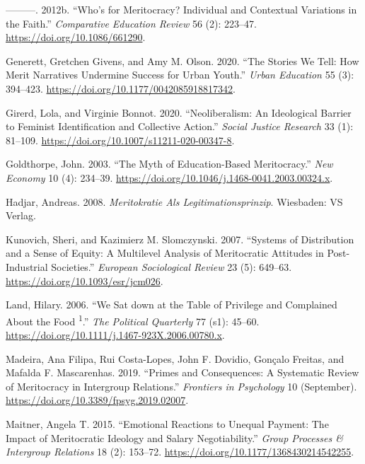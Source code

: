 \documentclass[
]{article}
\begin{document}
\leavevmode\hypertarget{ref-duru-bellat_whos_2012}{}%
---------. 2012b. ``Who's for Meritocracy? Individual and Contextual
Variations in the Faith.'' \emph{Comparative Education Review} 56 (2):
223--47. \url{https://doi.org/10.1086/661290}.

\leavevmode\hypertarget{ref-GenerettStoriesWeTell2020}{}%
Generett, Gretchen Givens, and Amy M. Olson. 2020. ``The Stories We
Tell: How Merit Narratives Undermine Success for Urban Youth.''
\emph{Urban Education} 55 (3): 394--423.
\url{https://doi.org/10.1177/0042085918817342}.

\leavevmode\hypertarget{ref-GirerdNeoliberalismIdeologicalBarrier2020}{}%
Girerd, Lola, and Virginie Bonnot. 2020. ``Neoliberalism: An Ideological
Barrier to Feminist Identification and Collective Action.'' \emph{Social
Justice Research} 33 (1): 81--109.
\url{https://doi.org/10.1007/s11211-020-00347-8}.

\leavevmode\hypertarget{ref-goldthorpe_myth_2003}{}%
Goldthorpe, John. 2003. ``The Myth of Education-Based Meritocracy.''
\emph{New Economy} 10 (4): 234--39.
\url{https://doi.org/10.1046/j.1468-0041.2003.00324.x}.

\leavevmode\hypertarget{ref-hadjar_meritokratie_2008}{}%
Hadjar, Andreas. 2008. \emph{Meritokratie Als Legitimationsprinzip}.
Wiesbaden: VS Verlag.

\leavevmode\hypertarget{ref-kunovich_systems_2007}{}%
Kunovich, Sheri, and Kazimierz M. Slomczynski. 2007. ``Systems of
Distribution and a Sense of Equity: A Multilevel Analysis of
Meritocratic Attitudes in Post-Industrial Societies.'' \emph{European
Sociological Review} 23 (5): 649--63.
\url{https://doi.org/10.1093/esr/jcm026}.

\leavevmode\hypertarget{ref-landWeSatTable2006}{}%
Land, Hilary. 2006. ``We Sat down at the Table of Privilege and
Complained About the Food \textsuperscript{1}.'' \emph{The Political
Quarterly} 77 (s1): 45--60.
\url{https://doi.org/10.1111/j.1467-923X.2006.00780.x}.

\leavevmode\hypertarget{ref-MadeiraPrimesConsequencesSystematic2019}{}%
Madeira, Ana Filipa, Rui Costa-Lopes, John F. Dovidio, Gonçalo Freitas,
and Mafalda F. Mascarenhas. 2019. ``Primes and Consequences: A
Systematic Review of Meritocracy in Intergroup Relations.''
\emph{Frontiers in Psychology} 10 (September).
\url{https://doi.org/10.3389/fpsyg.2019.02007}.

\leavevmode\hypertarget{ref-MaitnerEmotionalreactionsunequal2015}{}%
Maitner, Angela T. 2015. ``Emotional Reactions to Unequal Payment: The
Impact of Meritocratic Ideology and Salary Negotiability.'' \emph{Group
Processes \& Intergroup Relations} 18 (2): 153--72.
\url{https://doi.org/10.1177/1368430214542255}.
\end{document}
